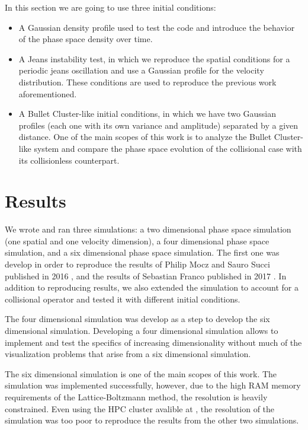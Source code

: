 In this section we are going to use three initial conditions:
\begin{itemize}
\item A Gaussian density profile used to test the code and introduce the behavior of the phase space density over time.
\item A Jeans instability test, in which we reproduce the spatial conditions for a periodic jeans oscillation and use a Gaussian profile for the velocity distribution. These conditions are used to reproduce the previous work aforementioned. 
\item A Bullet Cluster-like initial conditions, in which we have two Gaussian profiles (each one with its own variance and amplitude) separated by a given distance. One of the main scopes of this work is to analyze the Bullet Cluster-like system and compare the phase space evolution of the collisional case with its collisionless counterpart.
\end{itemize}



\chapter{Results}
We wrote and ran three simulations: a  two dimensional phase space simulation (one spatial and one velocity dimension), a four dimensional phase space simulation, and a six dimensional phase space simulation. 
The first one was develop in order to reproduce the results of Philip Mocz and Sauro Succi published in 2016 \cite{integerLatticeDynamics}, and the results of Sebastian Franco published in 2017 \cite{franco}.
In addition to reproducing results, we also extended the simulation to account for a collisional operator and tested it with different initial conditions.

The four dimensional simulation was develop as a step to develop the six dimensional simulation. Developing a four dimensional simulation allows to implement and test the specifics of increasing dimensionality without much of the visualization problems that arise from a six dimensional simulation. 

The six dimensional simulation is one of the main scopes of this work. The simulation was implemented successfully, however, due to the high RAM memory requirements of the Lattice-Boltzmann method, the resolution is heavily constrained. Even using the HPC cluster avalible at , the resolution of the simulation was too poor to reproduce the results from the other two simulations.

